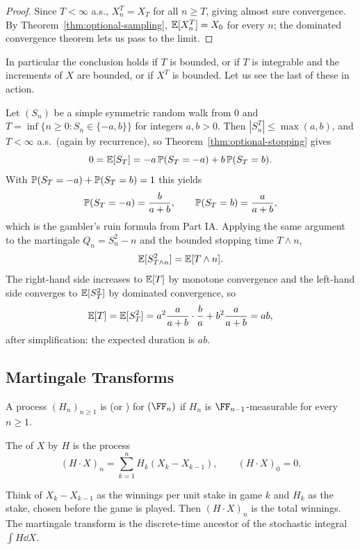\documentclass[a4paper]{scrartcl}
\begin{document}
\begin{proof}
	Since $T<\infty$ a.s., $X_n^T = X_T$ for all $n \geq T$, giving almost sure convergence. By Theorem~\ref{thm:optional-sampling}, $\mathbb{E}[X_n^T] = X_0$ for every $n$; the dominated convergence theorem lets us pass to the limit.
\end{proof}

In particular the conclusion holds if $T$ is bounded, or if $T$ is integrable and the increments of $X$ are bounded, or if $X^T$ is bounded. Let us see the last of these in action.

\begin{example}
	Let $(S_n)$ be a simple symmetric random walk from $0$ and $T = \inf\{n \geq 0: S_n \in \{-a,b\}\}$ for integers $a,b>0$. Then $|S_n^T|\leq \max(a,b)$, and $T<\infty$ a.s.\ (again by recurrence), so Theorem~\ref{thm:optional-stopping} gives
	$$
	0 = \mathbb{E}[S_T] = -a\,\mathbb{P}(S_T = -a) + b\,\mathbb{P}(S_T = b).
	$$
	With $\mathbb{P}(S_T=-a)+\mathbb{P}(S_T=b)=1$ this yields
	$$
	\mathbb{P}(S_T = -a) = \frac{b}{a+b},\qquad \mathbb{P}(S_T = b) = \frac{a}{a+b},
	$$
	which is the gambler's ruin formula from Part IA. Applying the same argument to the martingale $Q_n = S_n^2 - n$ and the bounded stopping time $T\wedge n$,
	$$
	\mathbb{E}[S^2_{T\wedge n}] = \mathbb{E}[T \wedge n].
	$$
	The right-hand side increases to $\mathbb{E}[T]$ by monotone convergence and the left-hand side converges to $\mathbb{E}[S_T^2]$ by dominated convergence, so
	$$
	\mathbb{E}[T] = \mathbb{E}[S_T^2] = a^2\frac{a}{a+b}\cdot\frac{b}{a} + b^2 \frac{a}{a+b} = ab,
	$$
	after simplification: the expected duration is $ab$.
\end{example}

\subsection{Martingale Transforms}

\begin{definition}
	A process $(H_n)_{n\geq1}$ is  (or ) for $(\FF_n)$ if $H_n$ is $\FF_{n-1}$-measurable for every $n \geq 1$.
\end{definition}

\begin{definition}
	The  of $X$ by $H$ is the process
	$$
	(H\cdot X)_n = \sum_{k=1}^n H_k(X_k - X_{k-1}), \qquad (H\cdot X)_0 = 0.
	$$
\end{definition}

Think of $X_k - X_{k-1}$ as the winnings per unit stake in game $k$ and $H_k$ as the stake, chosen before the game is played. Then $(H\cdot X)_n$ is the total winnings. The martingale transform is the discrete-time ancestor of the stochastic integral $\int H \dd X$.
\end{document}
